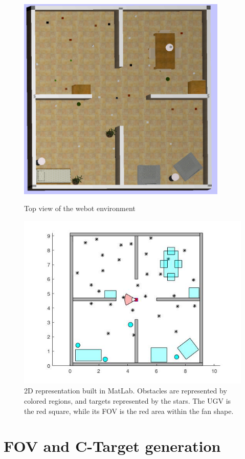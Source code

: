\documentclass[12pt,draftcls,onecolumn]{IEEEtran}
\begin{document}
\begin{figure}[p]
\centering
\includegraphics[width=10cm]{figures/webotTop}
  \caption{Top view of the webot environment}
  \label{fig:1}
\includegraphics[width=16cm]{figures/matlabExtraction}
  \caption{2D representation built in MatLab. Obstacles are represented by colored regions, and targets represented by the stars. The UGV is  the red square, while its FOV is the red area within the fan shape.}
  \label{fig:2}
\end{figure}



\clearpage


\section{FOV and C-Target generation} 
\end{document}
